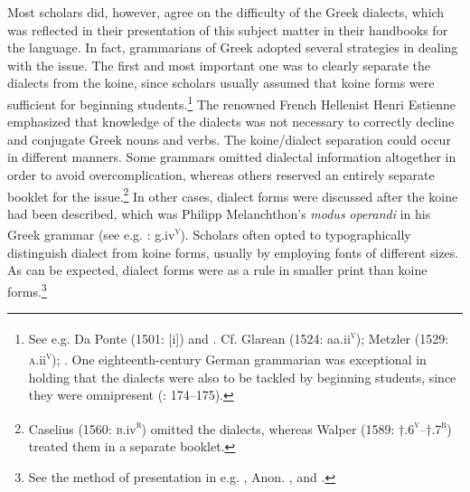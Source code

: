 \documentclass[output=paper]{langsci/langscibook}
\begin{document}
Most scholars did, however, agree on the difficulty of the Greek dialects, which was reflected in their presentation of this subject matter in their handbooks for the language. In fact, grammarians of Greek adopted several strategies in dealing with the issue. The first and most important one was to clearly separate the dialects from the koine, since scholars usually assumed that koine forms were sufficient for beginning students.\footnote{See e.g. Da Ponte (1501: [i]) and \citet[223]{Tavoni1986}. Cf. Glarean (1524: aa.ii\textsc{\textsuperscript{v}}); Metzler (1529: \textsc{a}.ii\textsc{\textsuperscript{v}}); \citet[105]{Rollin1726}. One eighteenth-century German grammarian was exceptional in holding that the dialects were also to be tackled by beginning students, since they were omnipresent (\citealt{Trendelenburg1782}: 174–175).} The renowned French Hellenist Henri Estienne emphasized that knowledge of the dialects was not necessary to correctly decline and conjugate Greek nouns and verbs. The koine/dialect separation could occur in different manners. Some grammars omitted dialectal information altogether in order to avoid overcomplication, whereas others reserved an entirely separate booklet for the issue.\footnote{Caselius (1560: \textsc{b.}iv\textsc{\textsuperscript{r}}) omitted the dialects, whereas Walper (1589: †.6\textsc{\textsuperscript{v}}–†.7\textsc{\textsuperscript{r}}) treated them in a separate booklet.} In other cases, dialect forms were discussed after the koine had been described, which was Philipp Melanchthon’s \textit{modus} \textit{operandi} in his Greek grammar (see e.g. \citealt{Melanchthon1518}: g.iv\textsc{\textsuperscript{v}}). Scholars often opted to typographically distinguish dialect from koine forms, usually by employing fonts of different sizes. As can be expected, dialect forms were as a rule in smaller print than koine forms.\footnote{See the method of presentation in e.g. \citet{Gretser1593}, Anon. , and \citet{Lancelot1655}.}
\end{document}
